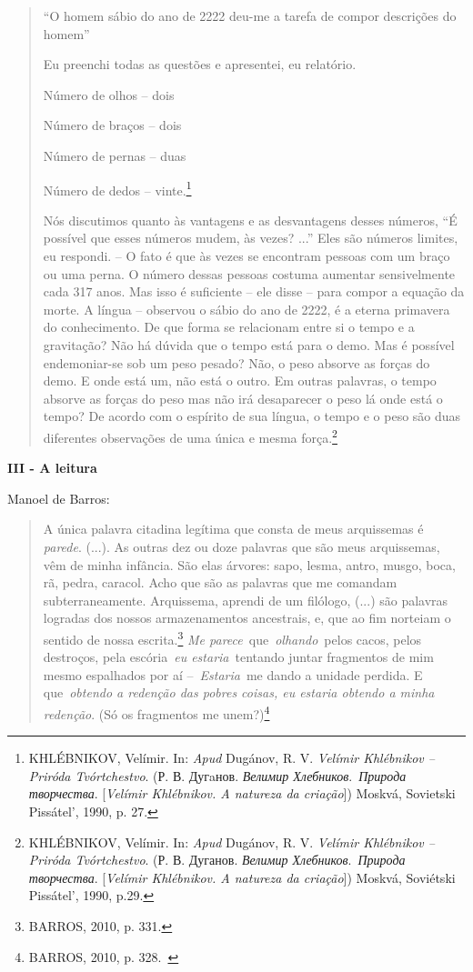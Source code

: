 \begin{quote}
``O homem sábio do ano de 2222 deu-me a tarefa de compor descrições do
homem''

Eu preenchi todas as questões e apresentei, eu relatório.

Número de olhos -- dois

Número de braços -- dois

Número de pernas -- duas

Número de dedos -- vinte.\footnote{KHLÉBNIKOV, Velímir. In: \emph{Apud}
  Dugánov, R. V. \emph{Velímir Khlébnikov -- Priróda Tvórtchestvo}. (Р.
  В. Дугaнов. \emph{Велимир Хлебников}.~\emph{Природа творчества}.
  {[}\emph{Velímir Khlébnikov. A natureza da criação}{]}) Moskvá,
  Sovietski Pissátel', 1990, p. 27.}

Nós discutimos quanto às vantagens e as desvantagens desses números, ``É
possível que esses números mudem, às vezes? ...'' Eles são números
limites, eu respondi. -- O fato é que às vezes se encontram pessoas com
um braço ou uma perna. O número dessas pessoas costuma aumentar
sensivelmente cada 317 anos. Mas isso é suficiente -- ele disse -- para
compor a equação da morte. A língua -- observou o sábio do ano de 2222,
é a eterna primavera do conhecimento. De que forma se relacionam entre
si o tempo e a gravitação? Não há dúvida que o tempo está para o demo.
Mas é possível endemoniar-se sob um peso pesado? Não, o peso absorve as
forças do demo. E onde está um, não está o outro. Em outras palavras, o
tempo absorve as forças do peso mas não irá desaparecer o peso lá onde
está o tempo? De acordo com o espírito de sua língua, o tempo e o peso
são duas diferentes observações de uma única e mesma força.\footnote{KHLÉBNIKOV,
  Velímir. In: \emph{Apud} Dugánov, R. V. \emph{Velímir Khlébnikov --
  Priróda Tvórtchestvo}. (Р. В. Дуганов. \emph{Велимир
  Хлебников}.~\emph{Природа творчества}. {[}\emph{Velímir Khlébnikov. A
  natureza da criação}{]}) Moskvá, Soviétski Pissátel', 1990, p.29.}
\end{quote}

\textbf{III - A leitura}

Manoel de Barros:

\begin{quote}
A única palavra citadina legítima que consta de meus arquissemas é
\emph{parede}. (...). As outras dez ou doze palavras que são meus
arquissemas, vêm de minha infância. São elas árvores: sapo, lesma,
antro, musgo, boca, rã, pedra, caracol. Acho que são as palavras que me
comandam subterraneamente. Arquissema, aprendi de um filólogo, (...) são
palavras logradas dos nossos armazenamentos ancestrais, e, que ao fim
norteiam o sentido de nossa escrita.\footnote{BARROS, 2010, p. 331.}
\emph{Me parece}~que~\emph{olhando}~pelos cacos, pelos destroços, pela
escória~\emph{eu estaria}~tentando juntar fragmentos de mim mesmo
espalhados por aí --~\emph{Estaria}~me dando a unidade perdida. E
que~\emph{obtendo a redenção das pobres coisas, eu estaria obtendo a
minha redenção}. (Só os fragmentos me unem?)\footnote{BARROS, 2010, p.
  328.~}
\end{quote}

